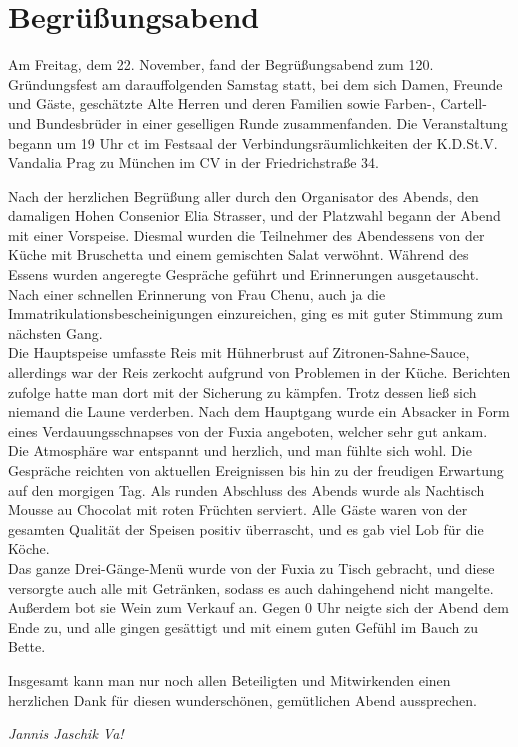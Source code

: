\section{Begrüßungsabend}

\begin{multicols}{2}
Am Freitag, dem 22. November, fand der Begrüßungsabend zum 120.
Gründungsfest am darauffolgenden Samstag statt, bei dem sich Damen, Freunde und
Gäste, geschätzte Alte Herren und deren Familien sowie Farben-, Cartell- und Bundesbrüder
in einer geselligen Runde zusammenfanden. Die Veranstaltung begann um 19 Uhr ct
im Festsaal der Verbindungsräumlichkeiten der K.D.St.V. Vandalia Prag zu
München im CV in der Friedrichstraße 34.

Nach der herzlichen Begrüßung aller durch den Organisator des Abends, den
damaligen Hohen Consenior Elia Strasser, und der Platzwahl begann der Abend mit
einer Vorspeise. Diesmal wurden die Teilnehmer des Abendessens von der Küche
mit Bruschetta und einem gemischten Salat verwöhnt. Während des Essens wurden
angeregte Gespräche geführt und Erinnerungen ausgetauscht. Nach einer schnellen
Erinnerung von Frau Chenu, auch ja die Immatrikulationsbescheinigungen
einzureichen, ging es mit guter Stimmung zum nächsten Gang.\\
Die Hauptspeise umfasste Reis mit Hühnerbrust auf Zitronen-Sahne-Sauce,
allerdings war der Reis zerkocht aufgrund von Problemen in der Küche. Berichten
zufolge hatte man dort mit der Sicherung zu kämpfen. Trotz dessen ließ sich
niemand die Laune verderben. Nach dem Hauptgang wurde ein Absacker in Form
eines Verdauungsschnapses von der Fuxia angeboten, welcher sehr gut ankam.\\
Die Atmosphäre war entspannt und herzlich, und man fühlte sich wohl. Die
Gespräche reichten von aktuellen Ereignissen bis hin zu der freudigen Erwartung
auf den morgigen Tag. Als runden Abschluss des Abends wurde als Nachtisch
Mousse au Chocolat mit roten Früchten serviert. Alle Gäste waren von der
gesamten Qualität der Speisen positiv überrascht, und es gab viel Lob für die
Köche.\\
Das ganze Drei-Gänge-Menü wurde von der Fuxia zu Tisch gebracht, und diese
versorgte auch alle mit Getränken, sodass es auch dahingehend nicht mangelte.
Außerdem bot sie Wein zum Verkauf an. Gegen 0 Uhr neigte sich der Abend dem
Ende zu, und alle gingen gesättigt und mit einem guten Gefühl im Bauch zu
Bette.

Insgesamt kann man nur noch allen Beteiligten und Mitwirkenden einen
herzlichen Dank für diesen wunderschönen, gemütlichen Abend aussprechen.

	\begin{flushright}
		\hfill\emph{Jannis Jaschik Va!}
	\end{flushright}
\end{multicols}
